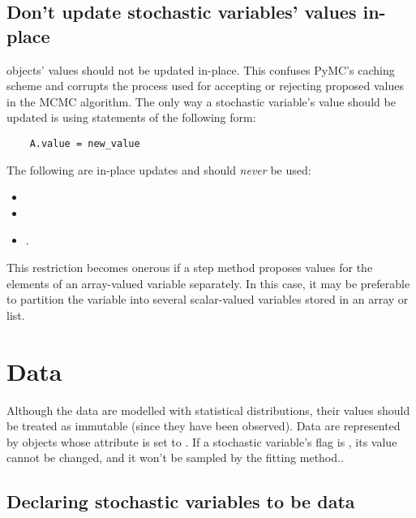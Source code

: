 \begin{center}
\begin{boxedminipage}{.9\textwidth} 
\subsection*{Don't update stochastic variables' values in-place}

 objects' values should not be updated in-place. This confuses PyMC's caching scheme and corrupts the process used for accepting or rejecting proposed values in the MCMC algorithm. The only way a stochastic variable's value should be updated is using statements of the following form:
\begin{verbatim}
    A.value = new_value
\end{verbatim}
The following are in-place updates and should \emph{never} be used:
\begin{itemize}
    \item {}
    \item {}
    \item {}.
\end{itemize}

This restriction becomes onerous if a step method proposes values for the elements of an array-valued variable separately. In this case, it may be preferable to partition the variable into several scalar-valued variables stored in an array or list.
\end{boxedminipage}
\end{center}

\hypertarget{data}{}
\section*{Data} \label{data}

Although the data are modelled with statistical distributions, their values should be treated as immutable (since they have been observed). Data are represented by  objects whose  attribute is set to . If a stochastic variable's  flag is , its value cannot be changed, and it won't be sampled by the fitting method..

\subsection*{Declaring stochastic variables to be data}

